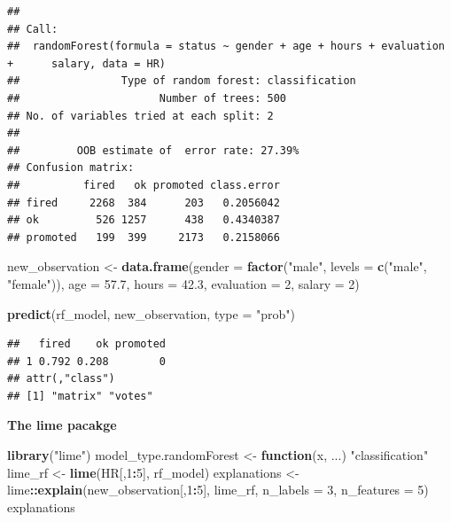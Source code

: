 \documentclass[]{book}
\newenvironment{Shaded}{\begin{snugshade}}{\end{snugshade}}
\newcommand{\ControlFlowTok}[1]{\textcolor[rgb]{0.13,0.29,0.53}{\textbf{#1}}}
\newcommand{\DataTypeTok}[1]{\textcolor[rgb]{0.13,0.29,0.53}{#1}}
\newcommand{\DecValTok}[1]{\textcolor[rgb]{0.00,0.00,0.81}{#1}}
\newcommand{\FloatTok}[1]{\textcolor[rgb]{0.00,0.00,0.81}{#1}}
\newcommand{\KeywordTok}[1]{\textcolor[rgb]{0.13,0.29,0.53}{\textbf{#1}}}
\newcommand{\NormalTok}[1]{#1}
\newcommand{\OperatorTok}[1]{\textcolor[rgb]{0.81,0.36,0.00}{\textbf{#1}}}
\newcommand{\StringTok}[1]{\textcolor[rgb]{0.31,0.60,0.02}{#1}}
\theoremstyle{definition}
\theoremstyle{definition}
\theoremstyle{definition}
\theoremstyle{remark}
\begin{document}
\begin{verbatim}
## 
## Call:
##  randomForest(formula = status ~ gender + age + hours + evaluation +      salary, data = HR) 
##                Type of random forest: classification
##                      Number of trees: 500
## No. of variables tried at each split: 2
## 
##         OOB estimate of  error rate: 27.39%
## Confusion matrix:
##          fired   ok promoted class.error
## fired     2268  384      203   0.2056042
## ok         526 1257      438   0.4340387
## promoted   199  399     2173   0.2158066
\end{verbatim}

\begin{Shaded}
\begin{Highlighting}[]
\NormalTok{new_observation <-}\StringTok{ }\KeywordTok{data.frame}\NormalTok{(}\DataTypeTok{gender =} \KeywordTok{factor}\NormalTok{(}\StringTok{"male"}\NormalTok{, }\DataTypeTok{levels =} \KeywordTok{c}\NormalTok{(}\StringTok{"male"}\NormalTok{, }\StringTok{"female"}\NormalTok{)),}
                      \DataTypeTok{age =} \FloatTok{57.7}\NormalTok{,}
                      \DataTypeTok{hours =} \FloatTok{42.3}\NormalTok{,}
                      \DataTypeTok{evaluation =} \DecValTok{2}\NormalTok{,}
                      \DataTypeTok{salary =} \DecValTok{2}\NormalTok{)}

\KeywordTok{predict}\NormalTok{(rf_model, new_observation, }\DataTypeTok{type =} \StringTok{"prob"}\NormalTok{)}
\end{Highlighting}
\end{Shaded}

\begin{verbatim}
##   fired    ok promoted
## 1 0.792 0.208        0
## attr(,"class")
## [1] "matrix" "votes"
\end{verbatim}

\textbf{The lime pacakge}

\begin{Shaded}
\begin{Highlighting}[]
\KeywordTok{library}\NormalTok{(}\StringTok{"lime"}\NormalTok{)}
\NormalTok{model_type.randomForest <-}\StringTok{ }\ControlFlowTok{function}\NormalTok{(x, ...) }\StringTok{"classification"}
\NormalTok{lime_rf <-}\StringTok{ }\KeywordTok{lime}\NormalTok{(HR[,}\DecValTok{1}\OperatorTok{:}\DecValTok{5}\NormalTok{], rf_model)}
\NormalTok{explanations <-}\StringTok{ }\NormalTok{lime}\OperatorTok{::}\KeywordTok{explain}\NormalTok{(new_observation[,}\DecValTok{1}\OperatorTok{:}\DecValTok{5}\NormalTok{], lime_rf, }\DataTypeTok{n_labels =} \DecValTok{3}\NormalTok{, }\DataTypeTok{n_features =} \DecValTok{5}\NormalTok{)}
\NormalTok{explanations}
\end{Highlighting}
\end{Shaded}
\end{document}
